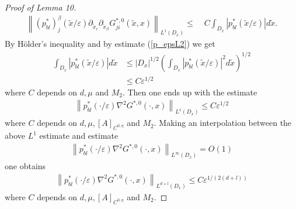\documentclass[11pt, reqno]{amsart}
\theoremstyle{definition}
\theoremstyle{remark}
\numberwithin{equation}{section}
\begin{document}
\begin{proof}[Proof of \textup{Lemma 10}]
		\begin{align*}
			\left\|(p^*_{bl})^{\beta}_{j}(\tilde{x}/\varepsilon) \partial_{\tilde{x}_r}\partial_{\tilde{x}_{\beta}}G_{ji}^{*,0}  (\tilde{x},x) \right\|_{L^1(D_x)}
			\leq& \; C \int_{D_x}  \left|p^*_{bl}(\tilde{x}/\varepsilon) \right| d\tilde{x}.
		\end{align*}
		By H\"older's inequality and by estimate (\ref{p_epsL2}) we get
		\begin{align*}
			\int_{D_x}   \left|p^*_{bl}	(\tilde{x}/\varepsilon) \right| d\tilde{x} &\leq  |D_x|^{1/2}\left(  \int_{D_x} \left|p^*_{bl}(\tilde{x}/\varepsilon)\right|^2  d\tilde{x} \right)^{1/2} \\
			&\leq C \varepsilon ^{1/2}	
		\end{align*}
		where $C$ depends on $d,\mu$ and $M_2$.
		Then one ends up with the estimate
		\begin{align*}
			\left\| p^*_{bl}  (\cdot/\varepsilon)\nabla^2 G^{*,0}(\cdot,x) \right\|_{L^1(D_x)}\leq C \varepsilon ^{1/2} 
		\end{align*}
		where $C$ depends on $d, \mu, [A]_{C^{0,\eta}}$ and $M_2$. Making an interpolation between the  above $L^1$ estimate and estimate
		\begin{align*}
			\left\| p^*_{bl}  (\cdot/\varepsilon) \nabla^2 G^{*,0} (\cdot,x) \right\|_{L^\infty(D_x)} =O(1)
		\end{align*}
		one obtains  \!\!\!
		\begin{align*}
			\left\|p^*_{bl}(\cdot/\varepsilon) \nabla^2 G^{*,0} (\cdot,x)\right\|_{L^{d+l}(D_x)} \leq C \varepsilon^{1/(2(d+l))}
		\end{align*}	where $C$ depends on $d, \mu, [A]_{C^{0,\eta}}$ and $M_2$.
	\end{proof}
	
	
	
\end{document}
